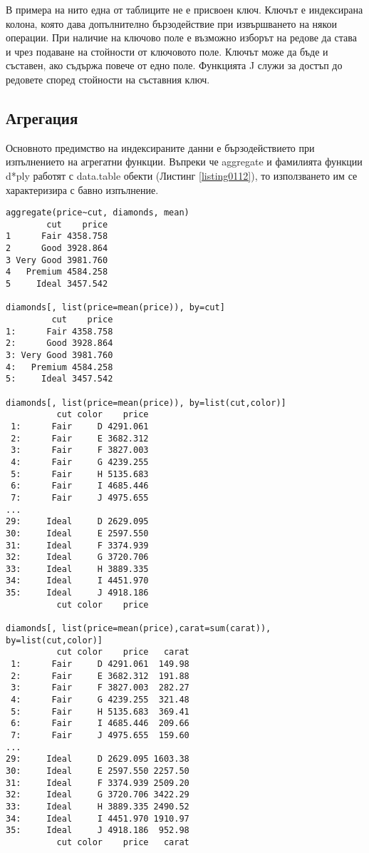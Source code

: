 В примера на нито една от таблиците не е присвоен ключ. Ключът е индексирана колона, която дава допълнително бързодействие при извършването на някои операции. При наличие на ключово поле е възможно изборът на редове да става и чрез подаване на стойности от ключовото поле. Ключът може да бъде и съставен, ако съдържа повече от едно поле. Функцията J служи за достъп до редовете според стойности на съставния ключ.

\subsection{Агрегация}

Основното предимство на индексираните данни е бързодействието при изпълнението на агрегатни функции. Въпреки че aggregate и фамилията функции d*ply работят с data.table обекти (Листинг \ref{listing0112}), то използването им се характеризира с бавно изпълнение.

\begin{lstlisting}[caption=Агрегатни функции, label=listing0112]
aggregate(price~cut, diamonds, mean)
        cut    price
1      Fair 4358.758
2      Good 3928.864
3 Very Good 3981.760
4   Premium 4584.258
5     Ideal 3457.542

diamonds[, list(price=mean(price)), by=cut]
         cut    price
1:      Fair 4358.758
2:      Good 3928.864
3: Very Good 3981.760
4:   Premium 4584.258
5:     Ideal 3457.542

diamonds[, list(price=mean(price)), by=list(cut,color)]
          cut color    price
 1:      Fair     D 4291.061
 2:      Fair     E 3682.312
 3:      Fair     F 3827.003
 4:      Fair     G 4239.255
 5:      Fair     H 5135.683
 6:      Fair     I 4685.446
 7:      Fair     J 4975.655
...
29:     Ideal     D 2629.095
30:     Ideal     E 2597.550
31:     Ideal     F 3374.939
32:     Ideal     G 3720.706
33:     Ideal     H 3889.335
34:     Ideal     I 4451.970
35:     Ideal     J 4918.186
          cut color    price

diamonds[, list(price=mean(price),carat=sum(carat)), by=list(cut,color)]
          cut color    price   carat
 1:      Fair     D 4291.061  149.98
 2:      Fair     E 3682.312  191.88
 3:      Fair     F 3827.003  282.27
 4:      Fair     G 4239.255  321.48
 5:      Fair     H 5135.683  369.41
 6:      Fair     I 4685.446  209.66
 7:      Fair     J 4975.655  159.60
...
29:     Ideal     D 2629.095 1603.38
30:     Ideal     E 2597.550 2257.50
31:     Ideal     F 3374.939 2509.20
32:     Ideal     G 3720.706 3422.29
33:     Ideal     H 3889.335 2490.52
34:     Ideal     I 4451.970 1910.97
35:     Ideal     J 4918.186  952.98
          cut color    price   carat
\end{lstlisting}


